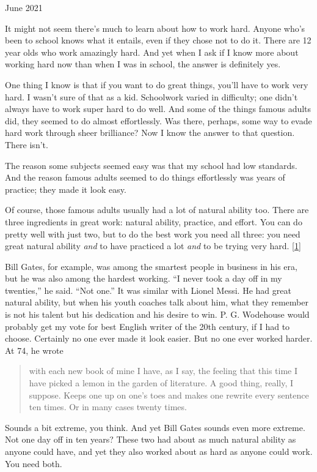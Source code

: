 June 2021

It might not seem there's much to learn about how to work hard. Anyone
who's been to school knows what it entails, even if they chose not to do
it. There are 12 year olds who work amazingly hard. And yet when I ask
if I know more about working hard now than when I was in school, the
answer is definitely yes.

One thing I know is that if you want to do great things, you'll have to
work very hard. I wasn't sure of that as a kid. Schoolwork varied in
difficulty; one didn't always have to work super hard to do well. And
some of the things famous adults did, they seemed to do almost
effortlessly. Was there, perhaps, some way to evade hard work through
sheer brilliance? Now I know the answer to that question. There isn't.

The reason some subjects seemed easy was that my school had low
standards. And the reason famous adults seemed to do things effortlessly
was years of practice; they made it look easy.

Of course, those famous adults usually had a lot of natural ability too.
There are three ingredients in great work: natural ability, practice,
and effort. You can do pretty well with just two, but to do the best
work you need all three: you need great natural ability \emph{and} to
have practiced a lot \emph{and} to be trying very hard.
{[}\hyperref[f1n]{1}{]}

Bill Gates, for example, was among the smartest people in business in
his era, but he was also among the hardest working. ``I never took a day
off in my twenties,'' he said. ``Not one.'' It was similar with Lionel
Messi. He had great natural ability, but when his youth coaches talk
about him, what they remember is not his talent but his dedication and
his desire to win. P. G. Wodehouse would probably get my vote for best
English writer of the 20th century, if I had to choose. Certainly no one
ever made it look easier. But no one ever worked harder. At 74, he wrote

\begin{quote}
with each new book of mine I have, as I say, the feeling that this time
I have picked a lemon in the garden of literature. A good thing, really,
I suppose. Keeps one up on one's toes and makes one rewrite every
sentence ten times. Or in many cases twenty times.
\end{quote}

Sounds a bit extreme, you think. And yet Bill Gates sounds even more
extreme. Not one day off in ten years? These two had about as much
natural ability as anyone could have, and yet they also worked about as
hard as anyone could work. You need both.

